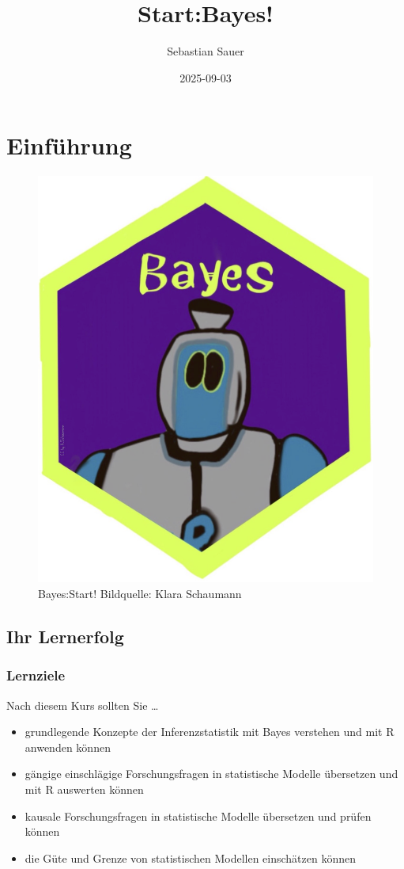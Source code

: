 \documentclass[
  ngerman,
  letterpaper,
]{scrbook}
\title{Start:Bayes!}
\author{Sebastian Sauer}
\date{2025-09-03}
\providecommand{\tightlist}{%
  \setlength{\itemsep}{0pt}\setlength{\parskip}{0pt}}
\begin{document}
\frontmatter
\maketitle


\mainmatter
\chapter{Einführung}\label{einfuxfchrung}

\begin{figure}[H]

{\centering \includegraphics[width=0.5\linewidth,height=\textheight,keepaspectratio]{img/Golem_hex.png}

}

\caption{Bayes:Start! Bildquelle: Klara Schaumann}

\end{figure}%

\section{Ihr Lernerfolg}\label{ihr-lernerfolg}

\subsection{Lernziele}\label{lernziele}

Nach diesem Kurs sollten Sie \ldots{}

\begin{itemize}
\tightlist
\item
  grundlegende Konzepte der Inferenzstatistik mit Bayes verstehen und
  mit R anwenden können
\item
  gängige einschlägige Forschungsfragen in statistische Modelle
  übersetzen und mit R auswerten können
\item
  kausale Forschungsfragen in statistische Modelle übersetzen und prüfen
  können
\item
  die Güte und Grenze von statistischen Modellen einschätzen können
\end{itemize}
\end{document}

